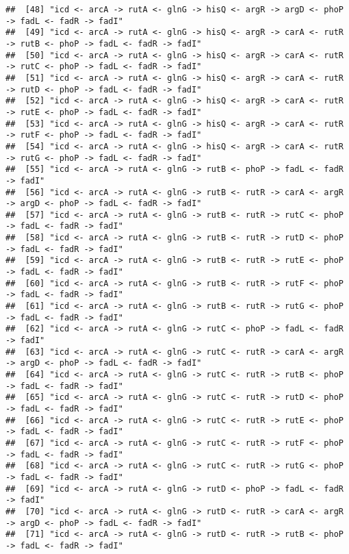 \documentclass[
]{article}
\begin{document}
\begin{verbatim}
##  [48] "icd <- arcA -> rutA <- glnG -> hisQ <- argR -> argD <- phoP -> fadL <- fadR -> fadI"                
##  [49] "icd <- arcA -> rutA <- glnG -> hisQ <- argR -> carA <- rutR -> rutB <- phoP -> fadL <- fadR -> fadI"
##  [50] "icd <- arcA -> rutA <- glnG -> hisQ <- argR -> carA <- rutR -> rutC <- phoP -> fadL <- fadR -> fadI"
##  [51] "icd <- arcA -> rutA <- glnG -> hisQ <- argR -> carA <- rutR -> rutD <- phoP -> fadL <- fadR -> fadI"
##  [52] "icd <- arcA -> rutA <- glnG -> hisQ <- argR -> carA <- rutR -> rutE <- phoP -> fadL <- fadR -> fadI"
##  [53] "icd <- arcA -> rutA <- glnG -> hisQ <- argR -> carA <- rutR -> rutF <- phoP -> fadL <- fadR -> fadI"
##  [54] "icd <- arcA -> rutA <- glnG -> hisQ <- argR -> carA <- rutR -> rutG <- phoP -> fadL <- fadR -> fadI"
##  [55] "icd <- arcA -> rutA <- glnG -> rutB <- phoP -> fadL <- fadR -> fadI"                                
##  [56] "icd <- arcA -> rutA <- glnG -> rutB <- rutR -> carA <- argR -> argD <- phoP -> fadL <- fadR -> fadI"
##  [57] "icd <- arcA -> rutA <- glnG -> rutB <- rutR -> rutC <- phoP -> fadL <- fadR -> fadI"                
##  [58] "icd <- arcA -> rutA <- glnG -> rutB <- rutR -> rutD <- phoP -> fadL <- fadR -> fadI"                
##  [59] "icd <- arcA -> rutA <- glnG -> rutB <- rutR -> rutE <- phoP -> fadL <- fadR -> fadI"                
##  [60] "icd <- arcA -> rutA <- glnG -> rutB <- rutR -> rutF <- phoP -> fadL <- fadR -> fadI"                
##  [61] "icd <- arcA -> rutA <- glnG -> rutB <- rutR -> rutG <- phoP -> fadL <- fadR -> fadI"                
##  [62] "icd <- arcA -> rutA <- glnG -> rutC <- phoP -> fadL <- fadR -> fadI"                                
##  [63] "icd <- arcA -> rutA <- glnG -> rutC <- rutR -> carA <- argR -> argD <- phoP -> fadL <- fadR -> fadI"
##  [64] "icd <- arcA -> rutA <- glnG -> rutC <- rutR -> rutB <- phoP -> fadL <- fadR -> fadI"                
##  [65] "icd <- arcA -> rutA <- glnG -> rutC <- rutR -> rutD <- phoP -> fadL <- fadR -> fadI"                
##  [66] "icd <- arcA -> rutA <- glnG -> rutC <- rutR -> rutE <- phoP -> fadL <- fadR -> fadI"                
##  [67] "icd <- arcA -> rutA <- glnG -> rutC <- rutR -> rutF <- phoP -> fadL <- fadR -> fadI"                
##  [68] "icd <- arcA -> rutA <- glnG -> rutC <- rutR -> rutG <- phoP -> fadL <- fadR -> fadI"                
##  [69] "icd <- arcA -> rutA <- glnG -> rutD <- phoP -> fadL <- fadR -> fadI"                                
##  [70] "icd <- arcA -> rutA <- glnG -> rutD <- rutR -> carA <- argR -> argD <- phoP -> fadL <- fadR -> fadI"
##  [71] "icd <- arcA -> rutA <- glnG -> rutD <- rutR -> rutB <- phoP -> fadL <- fadR -> fadI"                

\end{verbatim}
\end{document}
